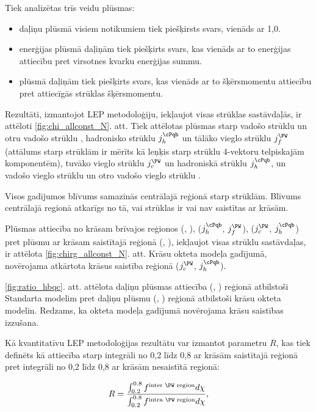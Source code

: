 \label{sec:LEP_methodology}

Tiek analizētas trīs veidu plūsmas:
\begin{itemize}
\item daļiņu plūsmā visiem notikumiem tiek piešķirsts svars, vienāds ar 1,0.
\item enerģijas plūsmā daļiņām tiek piešķirts svars, kas vienāds ar to enerģijas attiecību pret virsotnes kvarku enerģijas summu.
\item \pt plūsmā daļiņām tiek piešķirts svars, kas vienāds ar to šķērsmomentu attiecību pret attiecīgās strūklas šķērsmomentu.
\end{itemize}

Rezultāti, izmantojot LEP metodoloģiju, iekļaujot visas strūklas sastāvdaļās, ir attēloti \ref{fig:chi_allconst_N}. att. Tiek attēlotas plūsmas starp vadošo \cPqb strūklu \leadingb un otru vadošo \cPqb strūklu \scndleadingb, hadronisko \cPqb strūklu $j_{h}^{\cPqb}$ un tālāko vieglo strūklu $j_{f}^{\PW}$ (attālums starp strūklām ir mērīts kā leņķis starp strūklu 4-vektoru telpiskajām komponentēm), tuvāko vieglo strūklu $j_{c}^{\PW}$ un hadroniskā \cPqb strūklu $j_{h}^{\cPqb}$, un vadošo vieglo strūklu \leadingjet un otro vadošo vieglo strūklu \scndleadingjet.

Visos gadījumos blīvums samazinās centrālajā reģionā starp strūklām. Blīvums centrālajā regionā atkarīgs no tā, vai strūklas ir vai nav saistītas ar krāsām.

Plūsmas attiecība no krāsam brīvajos reģionos (\leadingb, \scndleadingb), ($j_{h}^{\cPqb}$, $j_{f}^{\PW}$), ($j_{c}^{\PW}$, $j_{h}^{\cPqb}$) pret plūsmu ar krāsam saistītajā reģionā (\leadingjet, \scndleadingjet), iekļaujot visas strūklu sastāvdaļas, ir attēlota \ref{fig:chirg_allconst_N}. att. Krāsu okteta \PW modeļa gadījumā, novērojama atkārtota krāsus saistība reģionā ($j_{c}^{\PW}$, $j_{h}^{\cPqb}$).

\ref{fig:ratio_hbqc}. att. attēlota daļiņu plūsmas attiecība (\leadingjet, \scndleadingjet) reģionā atbilstoši Standarta modelim pret daļiņu plūsmu (\leadingjet, \scndleadingjet) reģionā atbilstoši krāsu okteta \PW modelin. Redzams, ka \PW okteta modeļa gadījumā novērojama krāsu saistības izzušana.

Kā kvantitatīvu LEP metodoloģijas rezultātu var izmantot parametru $R$, kas tiek definēts kā attiecība starp integrāli no 0,2 līdz 0,8 ar krāsām saistītajā reģionā pret integrāli no 0,2 līdz 0,8 ar krāsām nesaistītā regionā:

\begin{equation}
R=\frac{\int_{0.2}^{0.8}f^{\text{inter \PW region}}d\chi}{\int_{0.2}^{0.8}f^{\text{intra \PW region}}d\chi},
\end{equation}

